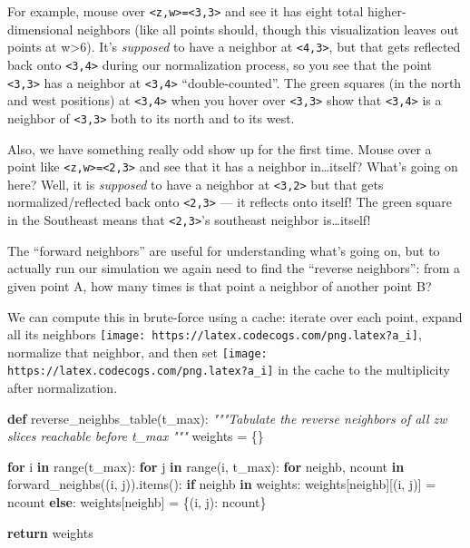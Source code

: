 \documentclass[]{article}
\newenvironment{Shaded}{}{}
\newcommand{\BuiltInTok}[1]{#1}
\newcommand{\CommentTok}[1]{\textcolor[rgb]{0.38,0.63,0.69}{\textit{#1}}}
\newcommand{\ControlFlowTok}[1]{\textcolor[rgb]{0.00,0.44,0.13}{\textbf{#1}}}
\newcommand{\KeywordTok}[1]{\textcolor[rgb]{0.00,0.44,0.13}{\textbf{#1}}}
\newcommand{\NormalTok}[1]{#1}
\newcommand{\OperatorTok}[1]{\textcolor[rgb]{0.40,0.40,0.40}{#1}}
\begin{document}
For example, mouse over
\texttt{\textless{}z,w\textgreater{}=\textless{}3,3\textgreater{}} and see it
has eight total higher-dimensional neighbors (like all points should, though
this visualization leaves out points at w\textgreater6). It's \emph{supposed} to
have a neighbor at \texttt{\textless{}4,3\textgreater{}}, but that gets
reflected back onto \texttt{\textless{}3,4\textgreater{}} during our
normalization process, so you see that the point
\texttt{\textless{}3,3\textgreater{}} has a neighbor at
\texttt{\textless{}3,4\textgreater{}} ``double-counted''. The green squares (in
the north and west positions) at \texttt{\textless{}3,4\textgreater{}} when you
hover over \texttt{\textless{}3,3\textgreater{}} show that
\texttt{\textless{}3,4\textgreater{}} is a neighbor of
\texttt{\textless{}3,3\textgreater{}} both to its north and to its west.

Also, we have something really odd show up for the first time. Mouse over a
point like \texttt{\textless{}z,w\textgreater{}=\textless{}2,3\textgreater{}}
and see that it has a neighbor in\ldots itself? What's going on here? Well, it
is \emph{supposed} to have a neighbor at \texttt{\textless{}3,2\textgreater{}}
but that gets normalized/reflected back onto
\texttt{\textless{}2,3\textgreater{}} --- it reflects onto itself! The green
square in the Southeast means that \texttt{\textless{}2,3\textgreater{}}'s
southeast neighbor is\ldots itself!

The ``forward neighbors'' are useful for understanding what's going on, but to
actually run our simulation we again need to find the ``reverse neighbors'':
from a given point A, how many times is that point a neighbor of another point
B?

We can compute this in brute-force using a cache: iterate over each point,
expand all its neighbors
\texttt{[image: https://latex.codecogs.com/png.latex?a\_i]}, normalize that
neighbor, and then set
\texttt{[image: https://latex.codecogs.com/png.latex?a\_i]} in the cache to the
multiplicity after normalization.

\begin{Shaded}
\begin{Highlighting}[]
\KeywordTok{def}\NormalTok{ reverse\_neighbs\_table(t\_max):}
    \CommentTok{"""Tabulate the reverse neighbors of all zw slices reachable before t\_max}
\CommentTok{    """}
\NormalTok{    weights }\OperatorTok{=}\NormalTok{ \{\}}

    \ControlFlowTok{for}\NormalTok{ i }\KeywordTok{in} \BuiltInTok{range}\NormalTok{(t\_max):}
        \ControlFlowTok{for}\NormalTok{ j }\KeywordTok{in} \BuiltInTok{range}\NormalTok{(i, t\_max):}
            \ControlFlowTok{for}\NormalTok{ neighb, ncount }\KeywordTok{in}\NormalTok{ forward\_neighbs((i, j)).items():}
                \ControlFlowTok{if}\NormalTok{ neighb }\KeywordTok{in}\NormalTok{ weights:}
\NormalTok{                    weights[neighb][(i, j)] }\OperatorTok{=}\NormalTok{ ncount}
                \ControlFlowTok{else}\NormalTok{:}
\NormalTok{                    weights[neighb] }\OperatorTok{=}\NormalTok{ \{(i, j): ncount\}}

    \ControlFlowTok{return}\NormalTok{ weights}
\end{Highlighting}
\end{Shaded}
\end{document}
